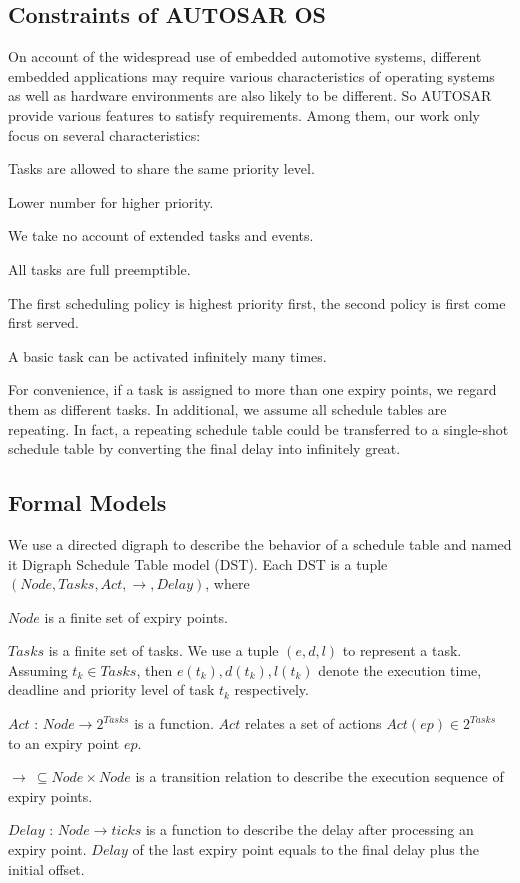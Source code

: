 \documentclass[conference]{IEEEtran}
\begin{document}
\subsection{Constraints of AUTOSAR OS}
On account of the widespread use of embedded automotive systems, different embedded applications may require various characteristics of operating systems as well as hardware environments are also likely to be different. So AUTOSAR provide various features to satisfy requirements. Among them, our work only focus on several characteristics: 
\begin{compactenum}
  \item Tasks are allowed to share the same priority level.
  \item Lower number for higher priority.
  \item We take no account of extended tasks and events.
  \item All tasks are full preemptible.
  \item The first scheduling policy is highest priority first, the second policy is first come first served.
  \item A basic task can be activated infinitely many times. 
\end{compactenum}

For convenience, if a task is assigned to more than one expiry points, we regard them as different tasks. In additional, we assume all schedule tables are repeating. In fact, a repeating schedule table could be transferred to a single-shot schedule table by converting the final delay into infinitely great.

\subsection{Formal Models}
We use a directed digraph to describe the behavior of a schedule table and named it Digraph Schedule Table model (DST). Each DST is a tuple $(Node,Tasks,Act,\rightarrow,Delay)$, where
\begin{compactitem}
  \item $Node$ is a finite set of expiry points.
  \item $Tasks$ is a finite set of tasks. We use a tuple $(e,d,l)$ to represent a task. Assuming $t_k\in Tasks$, then $e(t_k),d(t_k),l(t_k)$ denote the execution time, deadline and priority level of task $t_k$ respectively.%
  \item $Act$ : $Node \rightarrow 2^{Tasks}$ is a function. $Act$ relates a set of actions $Act(ep)\in 2^{Tasks}$ to an expiry point $ep$.
  \item $\rightarrow\ \subseteq Node\times Node$ is a transition relation to describe the execution sequence of expiry points. 
  \item $Delay$ : $Node \rightarrow ticks$ is a function to describe the delay after processing an expiry point. $Delay$ of the last expiry point equals to the final delay plus the initial offset.
\end{compactitem}
\end{document}
